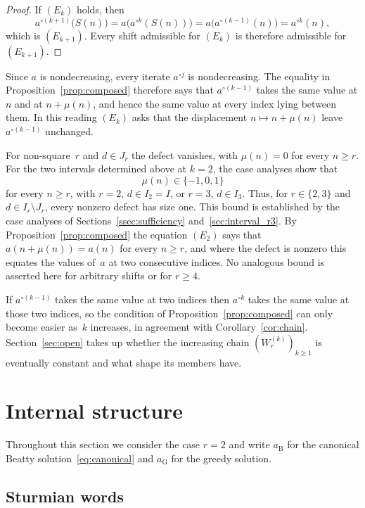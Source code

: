 \documentclass{birkjour}
\theoremstyle{definition}
\theoremstyle{remark}
\begin{document}
\begin{proof}
If $(E_{k})$ holds, then
\[
  a^{\circ(k+1)}\bigl(S(n)\bigr)
  =a\bigl(a^{\circ k}(S(n))\bigr)
  =a\bigl(a^{\circ(k-1)}(n)\bigr)
  =a^{\circ k}(n),
\]
which is $(E_{k+1})$. Every shift admissible for $(E_{k})$ is
therefore admissible for $(E_{k+1})$.
\end{proof}

Since $a$ is nondecreasing, every iterate $a^{\circ j}$ is
nondecreasing. The equality in
Proposition~\ref{prop:composed} therefore says that
$a^{\circ(k-1)}$ takes the same value at $n$ and at
$n+\mu(n)$, and hence the same value at every index lying
between them. In this reading
$(E_{k})$ asks that the displacement $n\mapsto n+\mu(n)$ leave
$a^{\circ(k-1)}$ unchanged.

For non-square~$r$ and $d\in J_{r}$ the defect vanishes, with
$\mu(n)=0$ for every $n\ge r$. For the two intervals
determined above at $k=2$, the case analyses show that
\[
  \mu(n)\in\{-1,0,1\}
\]
for every $n\ge r$, with $r=2$, $d\in I_{2}=I$, or $r=3$,
$d\in I_{3}$. Thus, for $r\in\{2,3\}$ and $d\in I_{r}\setminus J_{r}$, every
nonzero defect has size one. This bound is
established by the case analyses of
Sections~\ref{ssec:sufficiency} and~\ref{sec:interval_r3}. By
Proposition~\ref{prop:composed} the equation $(E_{2})$ says
that $a(n+\mu(n))=a(n)$ for every $n\ge r$, and where the
defect is nonzero this equates the values of~$a$ at two
consecutive indices. No analogous bound is asserted here
for arbitrary shifts or for $r\ge 4$.

If $a^{\circ(k-1)}$ takes the same value at two indices then
$a^{\circ k}$ takes the same value at those two indices, so the condition of
Proposition~\ref{prop:composed} can only become easier as~$k$
increases, in agreement with Corollary~\ref{cor:chain}.
Section~\ref{sec:open} takes up whether the increasing
chain $(W_{r}^{(k)})_{k\ge 1}$ is eventually constant and
what shape its members have.

\section{Internal structure}\label{sec:structure}

Throughout this section we consider the case $r=2$
and write $a_{\mathrm{B}}$ for the canonical Beatty
solution~\eqref{eq:canonical} and
$a_{\mathrm{G}}$ for the greedy solution.

\subsection{Sturmian words}
\end{document}
